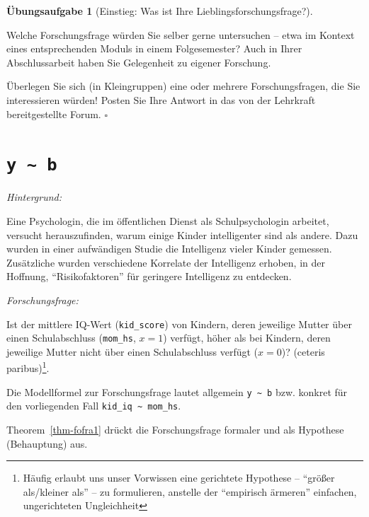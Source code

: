 \documentclass[
  ngerman,
  letterpaper,
  twoside,
  open=any]{scrbook}
\theoremstyle{definition}
\theoremstyle{plain}
\theoremstyle{definition}
\newtheorem{exercise}{Übungsaufgabe}[chapter]
\theoremstyle{definition}
\theoremstyle{definition}
\theoremstyle{definition}
\newtheorem{exercise}{Übungsaufgabe}[chapter]
\theoremstyle{remark}
\begin{document}
\begin{exercise}[Einstieg: Was ist Ihre
Lieblingsforschungsfrage?]\protect\hypertarget{exr-einstieg}{}\label{exr-einstieg}

Welche Forschungsfrage würden Sie selber gerne untersuchen -- etwa im
Kontext eines entsprechenden Moduls in einem Folgesemester? Auch in
Ihrer Abschlussarbeit haben Sie Gelegenheit zu eigener Forschung.

Überlegen Sie sich (in Kleingruppen) eine oder mehrere Forschungsfragen,
die Sie interessieren würden! Posten Sie Ihre Antwort in das von der
Lehrkraft bereitgestellte Forum. \(\square\)

\end{exercise}

\section{\texorpdfstring{\texttt{y\ \textasciitilde{}\ b}}{y \textasciitilde{} b}}\label{y-b}

\emph{Hintergrund:}

Eine Psychologin, die im öffentlichen Dienst als Schulpsychologin
arbeitet, versucht herauszufinden, warum einige Kinder intelligenter
sind als andere. Dazu wurden in einer aufwändigen Studie die Intelligenz
vieler Kinder gemessen. Zusätzliche wurden verschiedene Korrelate der
Intelligenz erhoben, in der Hoffnung, \enquote{Risikofaktoren} für
geringere Intelligenz zu entdecken.

\emph{Forschungsfrage:}

\begin{displayquote}
Ist der mittlere IQ-Wert (\texttt{kid\_score}) von Kindern, deren
jeweilige Mutter über einen Schulabschluss (\texttt{mom\_hs}, \(x=1\))
verfügt, höher als bei Kindern, deren jeweilige Mutter nicht über einen
Schulabschluss verfügt (\(x=0\))? (ceteris paribus)\footnote{Häufig
  erlaubt uns unser Vorwissen eine gerichtete Hypothese --
  \enquote{größer als/kleiner als} -- zu formulieren, anstelle der
  \enquote{empirisch ärmeren} einfachen, ungerichteten Ungleichheit}.
\end{displayquote}

Die Modellformel zur Forschungsfrage lautet allgemein
\texttt{y\ \textasciitilde{}\ b} bzw. konkret für den vorliegenden Fall
\texttt{kid\_iq\ \textasciitilde{}\ mom\_hs}.

Theorem~\ref{thm-fofra1} drückt die Forschungsfrage formaler und als
Hypothese (Behauptung) aus.
\end{document}
